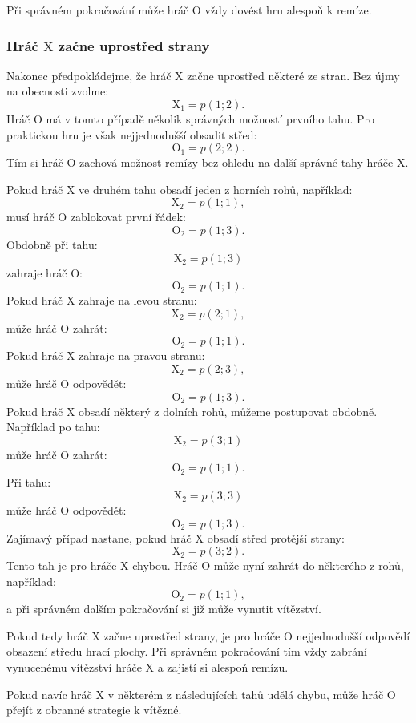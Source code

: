 \documentclass[12pt,a4paper]{article}
\begin{document}
Při správném pokračování může hráč $\mathrm{O}$ vždy dovést hru alespoň k remíze.

\subsubsection*{Hráč $\mathrm{X}$ začne uprostřed strany}
Nakonec předpokládejme, že hráč $\mathrm{X}$ začne uprostřed některé ze stran.
Bez újmy na obecnosti zvolme:
\[
    \mathrm{X}_1=p(1;2).
\]
Hráč $\mathrm{O}$ má v tomto případě několik správných možností prvního tahu.
Pro praktickou hru je však nejjednodušší obsadit střed:
\[
    \mathrm{O}_1=p(2;2).
\]
Tím si hráč $\mathrm{O}$ zachová možnost remízy bez ohledu 
na další správné tahy hráče $\mathrm{X}$.

Pokud hráč $\mathrm{X}$ ve druhém tahu obsadí jeden z horních rohů, například:
\[
    \mathrm{X}_2=p(1;1),
\]
musí hráč $\mathrm{O}$ zablokovat první řádek:
\[
    \mathrm{O}_2=p(1;3).
\]
Obdobně při tahu:
\[
    \mathrm{X}_2=p(1;3)
\]
zahraje hráč $\mathrm{O}$:
\[
    \mathrm{O}_2=p(1;1).
\]
Pokud hráč $\mathrm{X}$ zahraje na levou stranu:
\[
    \mathrm{X}_2=p(2;1),
\]
může hráč $\mathrm{O}$ zahrát:
\[
    \mathrm{O}_2=p(1;1).
\]
Pokud hráč $\mathrm{X}$ zahraje na pravou stranu:
\[
    \mathrm{X}_2=p(2;3),
\]
může hráč $\mathrm{O}$ odpovědět:
\[
    \mathrm{O}_2=p(1;3).
\]
Pokud hráč $\mathrm{X}$ obsadí některý z dolních rohů, můžeme postupovat obdobně.
Například po tahu:
\[
    \mathrm{X}_2=p(3;1)
\]
může hráč $\mathrm{O}$ zahrát:
\[
    \mathrm{O}_2=p(1;1).
\]
Při tahu:
\[
    \mathrm{X}_2=p(3;3)
\]
může hráč $\mathrm{O}$ odpovědět:
\[
    \mathrm{O}_2=p(1;3).
\]
Zajímavý případ nastane, pokud hráč $\mathrm{X}$ obsadí střed protější strany:
\[
    \mathrm{X}_2=p(3;2).
\]
Tento tah je pro hráče $\mathrm{X}$ chybou.
Hráč $\mathrm{O}$ může nyní zahrát do některého z rohů, například:
\[
    \mathrm{O}_2=p(1;1),
\]
a při správném dalším pokračování si již může vynutit vítězství.

Pokud tedy hráč $\mathrm{X}$ začne uprostřed strany, 
je pro hráče $\mathrm{O}$ nejjednodušší odpovědí obsazení středu hrací plochy.
Při správném pokračování tím vždy zabrání vynucenému vítězství 
hráče $\mathrm{X}$ a zajistí si alespoň remízu.

Pokud navíc hráč $\mathrm{X}$ v některém z následujících tahů udělá chybu, 
může hráč $\mathrm{O}$ přejít z obranné strategie k vítězné.
\end{document}
